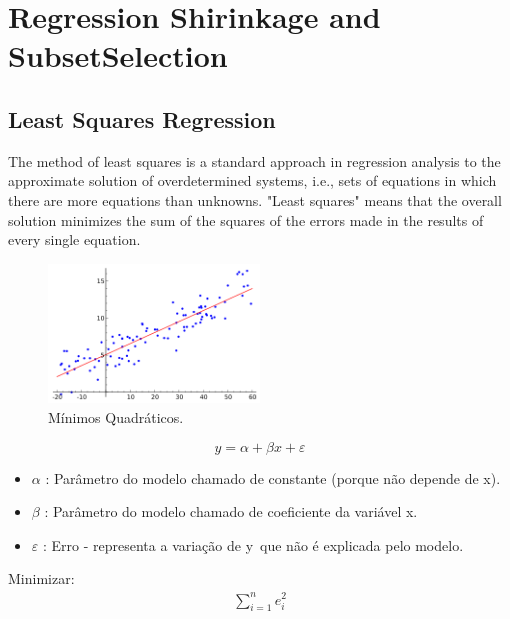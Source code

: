 \documentclass{beamer}
\begin{document}
\section{Regression Shirinkage and SubsetSelection}

\subsection{Least Squares Regression}
\begin{frame}
	The method of least squares is a standard approach in regression analysis to the
	approximate solution of overdetermined systems, i.e., sets of equations in which
	there are more equations than unknowns. "Least squares" means that the overall
	solution minimizes the sum of the squares of the errors made in the results of
	every single equation.

\begin{figure}[h!] \caption{Mínimos Quadráticos.} \centering
	\includegraphics[width=0.5\textwidth]{imagens/lsr.png} 
\end{figure}
\end{frame}




\begin{frame}
	\begin{equation}
		y = \alpha + \beta x + \varepsilon
	\end{equation}
	
	\begin{itemize}{}
	\item  $\alpha$ : Parâmetro do modelo chamado de constante (porque não depende
	de x).
	\item $\beta$ : Parâmetro do modelo chamado de coeficiente da variável x.
	\item   $\varepsilon$ : Erro - representa a variação de y\,\! que não é
	explicada pelo modelo.
	\end{itemize}
	
	Minimizar:
	\begin{align}
	\sum_{i=1}^n e_i^2
	\end{align}

\end{frame}
\end{document}
